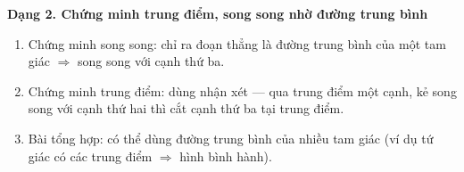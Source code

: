 \textbf{Dạng 2. Chứng minh trung điểm, song song nhờ đường trung bình}
\begin{enumerate}
\item Chứng minh song song: chỉ ra đoạn thẳng là đường trung bình của một tam giác $\Rightarrow$ song song với cạnh thứ ba.
\item Chứng minh trung điểm: dùng nhận xét — qua trung điểm một cạnh, kẻ song song với cạnh thứ hai thì cắt cạnh thứ ba tại trung điểm.
\item Bài tổng hợp: có thể dùng đường trung bình của nhiều tam giác (ví dụ tứ giác có các trung điểm $\Rightarrow$ hình bình hành).
\end{enumerate}
